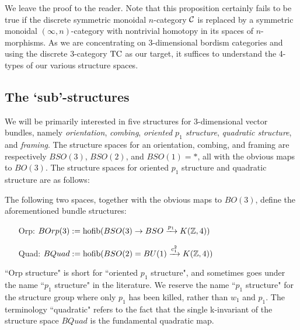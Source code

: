 \documentclass{amsart}
\begin{document}
\nid We leave the proof to the reader.  Note that this proposition certainly fails to be true if the discrete symmetric monoidal $n$-category $\mathcal C$ is replaced by a symmetric monoidal $(\infty,n)$-category with nontrivial homotopy in its spaces of $n$-morphisms.  As we are concentrating on 3-dimensional bordism categories and using the discrete 3-category $\mathrm{TC}$ as our target, it suffices to understand the 4-types of our various structure spaces.


\subsection{The `sub'-structures}


We will be primarily interested in five structures for 3-dimensional vector bundles, namely \emph{orientation}, \emph{combing}, \emph{oriented $p_1$ structure}, \emph{quadratic structure}, and \emph{framing}.  The structure spaces for an orientation, combing, and framing are respectively $BSO(3)$, $BSO(2)$, and $BSO(1) = *$, all with the obvious maps to $BO(3)$.  The structure spaces for oriented $p_1$ structure and quadratic structure are as follows:

\begin{definition}
The following two spaces, together with the obvious maps to $BO(3)$, define the aforementioned bundle structures:
\begin{itemize}
\item[Orp:] $BOrp(3) := \operatorname{hofib}(BSO(3) \rightarrow BSO \xrightarrow{p_1} K(\mathbb Z,4))$
\item[Quad:] $BQuad := \operatorname{hofib}(BSO(2) = BU(1) \xrightarrow{c_1^2} K(\mathbb Z,4))$
\end{itemize}
\end{definition}

\begin{remark}
``Orp structure" is short for ``oriented $p_1$ structure", and sometimes goes under the name ``$p_1$ structure" in the literature.  We reserve the name ``$p_1$ structure" for the structure group where only $p_1$ has been killed, rather than $w_1$ and $p_1$.  The terminology ``quadratic" refers to the fact that the single k-invariant of the structure space $BQuad$ is the fundamental quadratic map.
\end{remark}
\end{document}

